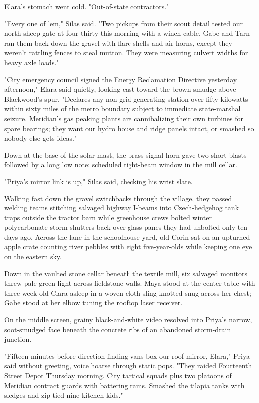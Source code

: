 Elara's stomach went cold. "Out-of-state contractors."

"Every one of 'em," Silas said. "Two pickups from their scout detail tested our north sheep gate at four-thirty this morning with a winch cable. Gabe and Tarn ran them back down the gravel with flare shells and air horns, except they weren't rattling fences to steal mutton. They were measuring culvert widths for heavy axle loads."

"City emergency council signed the Energy Reclamation Directive yesterday afternoon," Elara said quietly, looking east toward the brown smudge above Blackwood's spur. "Declares any non-grid generating station over fifty kilowatts within sixty miles of the metro boundary subject to immediate state-marshal seizure. Meridian's gas peaking plants are cannibalizing their own turbines for spare bearings; they want our hydro house and ridge panels intact, or smashed so nobody else gets ideas."

Down at the base of the solar mast, the brass signal horn gave two short blasts followed by a long low note: scheduled tight-beam window in the mill cellar.

"Priya's mirror link is up," Silas said, checking his wrist slate.

Walking fast down the gravel switchbacks through the village, they passed welding teams stitching salvaged highway I-beams into Czech-hedgehog tank traps outside the tractor barn while greenhouse crews bolted winter polycarbonate storm shutters back over glass panes they had unbolted only ten days ago. Across the lane in the schoolhouse yard, old Corin sat on an upturned apple crate counting river pebbles with eight five-year-olds while keeping one eye on the eastern sky.

Down in the vaulted stone cellar beneath the textile mill, six salvaged monitors threw pale green light across fieldstone walls. Maya stood at the center table with three-week-old Clara asleep in a woven cloth sling knotted snug across her chest; Gabe stood at her elbow tuning the rooftop laser receiver.

On the middle screen, grainy black-and-white video resolved into Priya's narrow, soot-smudged face beneath the concrete ribs of an abandoned storm-drain junction.

"Fifteen minutes before direction-finding vans box our roof mirror, Elara," Priya said without greeting, voice hoarse through static pops. "They raided Fourteenth Street Depot Thursday morning. City tactical squads plus two platoons of Meridian contract guards with battering rams. Smashed the tilapia tanks with sledges and zip-tied nine kitchen kids."

